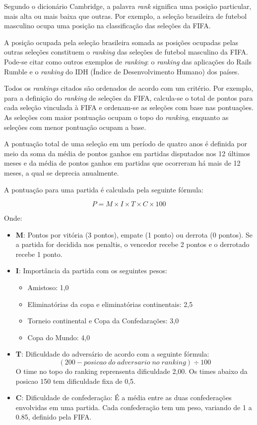 Segundo o dicionário Cambridge, a palavra \emph{rank} significa uma posição particular, mais alta ou mais baixa que outras. Por exemplo, a seleção brasileira de futebol masculino ocupa uma posição na classificação das seleções da FIFA.

A posição ocupada pela seleção brasileira somada as posições ocupadas pelas outras seleções constituem o \emph{ranking} das seleções de futebol masculino da FIFA. Pode-se citar como outros exemplos de \emph{ranking}: o \emph{ranking} das aplicações do Rails Rumble e o \emph{ranking} do IDH (Índice de Desenvolvimento Humano) dos países.

Todos os \emph{rankings} citados são ordenados de acordo com um critério. Por exemplo, para a definição do \emph{ranking} de seleções da FIFA, calcula-se o total de pontos para cada seleção vinculada à FIFA e ordenam-se as seleções com base nas pontuações. As seleções com maior pontuação ocupam o topo do \emph{ranking}, enquanto as seleções com menor pontuação ocupam a base.

A pontuação total de uma seleção em um período de quatro anos é definida por meio da soma da média de pontos ganhos em partidas disputados nos 12 últimos meses e da média de pontos ganhos em partidas que ocorreram há mais de 12 meses, a qual se deprecia anualmente.

A pontuação para uma partida é calculada pela seguinte fórmula:

\[P = M \times I \times T \times C \times 100\]

Onde:
\begin{itemize}

    \item {\bf M}: Pontos por vitória (3 pontos), empate (1 ponto) ou derrota (0 pontos). Se a partida for decidida nos penaltis, o vencedor recebe 2 pontos e o derrotado recebe 1 ponto.

    \item {\bf I}: Importância da partida com os seguintes pesos:
    \begin{itemize}
        \item Amistoso: 1,0
        \item Eliminatórias da copa e eliminatórias continentais: 2,5
        \item Torneio continental e Copa da Confedarações: 3,0
        \item Copa do Mundo: 4,0
    \end{itemize}

    \item {\bf T}: Dificuldade do adversário de acordo com a seguinte fórmula:
    \[(200 - posicao \; do \; adversario \; no \; ranking) \div 100\]
    O time no topo do ranking reprensenta dificuldade 2,00. Os times abaixo da posicao 150 tem dificuldade fixa de 0,5.

    \item {\bf C}: Dificuldade de confederação: É a média entre as duas confederações envolvidas em uma partida. Cada confederação tem um peso, variando de 1 a 0.85, definido pela FIFA.
    
\end{itemize}

